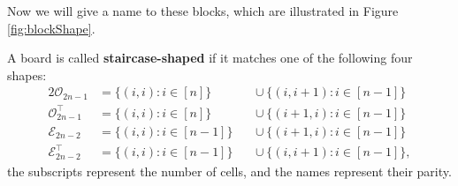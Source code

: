 

Now we will give a name to these blocks,
which are illustrated in Figure \ref{fig:blockShape}.

\begin{definition}
  A board is called \textbf{staircase-shaped} if it matches one of the
  following four shapes:
  \begin{alignat*}{2}
    \mathcal{O}_{2n-1}           &= \{(i,i) : i \in [n]\}    &&\cup\ \{(i,i+1) : i \in [n-1]\} \\
    \mathcal{O}_{2n-1}^\intercal &= \{(i,i) : i \in [n]\}    &&\cup\ \{(i+1,i) : i \in [n-1]\} \\
    \mathcal{E}_{2n-2}           &= \{(i,i) : i \in [n-1]\}\ &&\cup\ \{(i+1,i) : i \in [n-1]\} \\
    \mathcal{E}_{2n-2}^\intercal &= \{(i,i) : i \in [n-1]\}\ &&\cup\ \{(i,i+1) : i \in [n-1]\},
  \end{alignat*}
  the subscripts represent the number of cells, and the names represent their
  parity.
  \label{def:staircaseShaped}
\end{definition}

